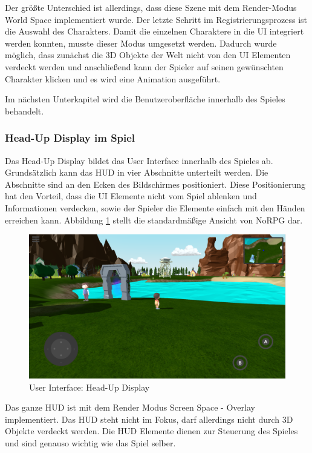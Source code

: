			Der größte Unterschied ist allerdings, dass diese Szene mit dem Render-Modus World Space implementiert wurde. Der letzte Schritt im Registrierungsprozess ist die Auswahl des Charakters. Damit die einzelnen Charaktere in die UI integriert werden konnten, musste dieser Modus umgesetzt werden. Dadurch wurde möglich, dass zunächst die 3D Objekte der Welt nicht von den UI Elementen verdeckt werden und anschließend kann der Spieler auf seinen gewünschten Charakter klicken und es wird eine Animation ausgeführt. 
			
			Im nächsten Unterkapitel wird die Benutzeroberfläche innerhalb des Spieles behandelt. 
		
		\subsubsection{Head-Up Display im Spiel}
			Das Head-Up Display bildet das User Interface innerhalb des Spieles ab. Grundsätzlich kann das HUD in vier Abschnitte unterteilt werden. Die Abschnitte sind an den Ecken des Bildschirmes positioniert. Diese Positionierung hat den Vorteil, dass die UI Elemente nicht vom Spiel ablenken und Informationen verdecken, sowie der Spieler die Elemente einfach mit den Händen erreichen kann. Abbildung \ref{alwaysOnUI} stellt die standardmäßige Ansicht von NoRPG dar.
			
			\begin{figure}[htbp]
				\centering 
				\label{alwaysOnUI}
				\includegraphics[width=13cm]{pics/alwaysOnUI.png}
				\caption{User Interface: Head-Up Display}
			\end{figure}
		
			Das ganze HUD ist mit dem Render Modus Screen Space - Overlay implementiert. Das HUD steht nicht im Fokus, darf allerdings nicht durch 3D Objekte verdeckt werden. Die HUD Elemente dienen zur Steuerung des Spieles und sind genauso wichtig wie das Spiel selber.
			
